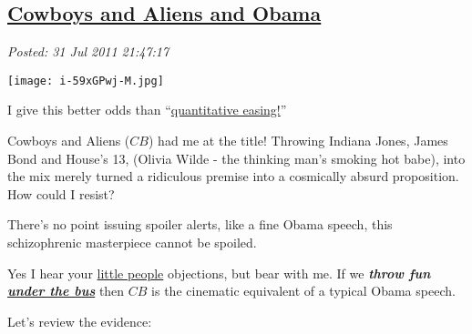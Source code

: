 %

\subsection*{\href{https://bakerjd99.wordpress.com/2011/07/31/cowboys-and-aliens-and-obama/}{Cowboys and Aliens and Obama}}


\noindent\emph{Posted: 31 Jul 2011 21:47:17}
\vspace{6pt}


\captionsetup[floatingfigure]{labelformat=empty}
\begin{floatingfigure}[l]{0.30\textwidth}
\centering
\texttt{[image: i-59xGPwj-M.jpg]}
\caption{I give  this better odds than ``\href{http://www.youtube.com/watch?v=PTUY16CkS-k}{quantitative  easing!}''}
\label{fig:1698X0}
\end{floatingfigure}Cowboys and Aliens ($CB$) had me at the title! Throwing Indiana Jones, James
Bond and House's 13, (Olivia Wilde - the thinking man's smoking hot
babe), into the mix merely turned a ridiculous premise into a cosmically
absurd proposition. How could I resist?

There's no point issuing spoiler alerts, like a fine Obama speech, this
schizophrenic masterpiece cannot be spoiled.

Yes I hear your
\href{http://www.nationalreview.com/corner/267605/safe-sex-and-taxes-are-little-people-victor-davis-hanson}{little
people} objections, but bear with me. If we \emph{\textbf{throw fun
\href{http://www.post-gazette.com/pg/08184/894024-51.stm}{under the
bus}}} then $CB$ is the cinematic equivalent of a typical Obama speech.



Let's review the evidence:

